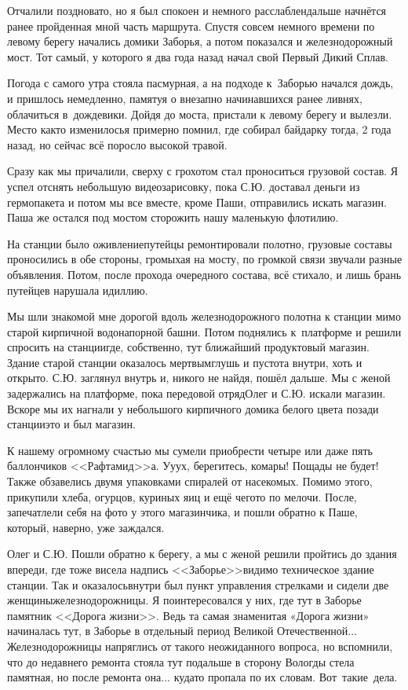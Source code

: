 Отчалили поздновато, но я был спокоен и немного расслаблен\mdash дальше начнётся ранее пройденная мной часть маршрута. Спустя совсем немного времени по левому берегу начались домики Заборья, а потом показался и железнодорожный мост. Тот самый, у которого я два года назад начал свой Первый Дикий Сплав. 

Погода с самого утра стояла пасмурная, а на подходе к~Заборью начался дождь, и пришлось немедленно, памятуя о внезапно начинавшихся ранее ливнях, облачиться в~дождевики. Дойдя до моста, пристали к левому берегу и вылезли. Место как\sdash то изменилось\mdash я примерно помнил, где собирал байдарку тогда, 2 года назад, но сейчас всё поросло высокой травой.

Сразу как мы причалили, сверху с грохотом стал проноситься грузовой состав. Я успел отснять небольшую видеозарисовку, пока С.Ю. доставал деньги из гермопакета и потом мы все вместе, кроме Паши, отправились искать магазин. Паша же остался под мостом сторожить нашу маленькую флотилию. 

На станции было оживление\mdash путейцы ремонтировали полотно, грузовые составы проносились в обе стороны, громыхая на мосту, по громкой связи звучали разные объявления. Потом, после прохода очередного состава, всё стихало, и лишь брань путейцев нарушала идиллию. 

Мы шли знакомой мне дорогой вдоль железнодорожного полотна к станции мимо старой кирпичной водонапорной башни. Потом поднялись к~платформе и решили спросить на станции\mdash где, собственно, тут ближайший продуктовый магазин. Здание старой станции оказалось мертвым\mdash глушь и пустота внутри, хоть и открыто. С.Ю. заглянул внутрь и, никого не найдя, пошёл дальше. Мы с женой задержались на платформе, пока передовой отряд\mdash Олег и С.Ю. искали магазин. Вскоре мы их нагнали у небольшого кирпичного домика белого цвета позади станции\mdash это и был магазин. 

К нашему огромному счастью мы сумели приобрести четыре или даже пять баллончиков <<Рафтамид>>\sdash а. У\sdash у\sdash у\sdash х, берегитесь, комары! Пощады не будет! Также обзавелись двумя упаковками спиралей от насекомых. Помимо этого, прикупили хлеба, огурцов, куриных яиц и ещё чего\sdash то по мелочи. После, запечатлели себя на фото у этого магазинчика, и пошли обратно к Паше, который, наверно, уже заждался.

Олег и С.Ю. Пошли обратно к берегу, а мы с женой решили пройтись до здания впереди, где тоже висела надпись <<Заборье>>\mdash видимо техническое здание станции. Так и оказалось\mdash внутри был пункт управления стрелками и сидели две женщины\sdash железнодорожницы. Я поинтересовался у них, где тут в Заборье памятник <<Дорога жизни>>. Ведь та самая знаменитая «Дорога жизни» начиналась тут, в Заборье в отдельный период Великой Отечественной$\ldots$ Железнодорожницы напряглись от такого неожиданного вопроса, но вспомнили, что до недавнего ремонта стояла тут подальше в сторону Вологды стела памятная, но после ремонта она$\ldots$ куда\sdash то пропала по их словам. Вот~такие~дела.


